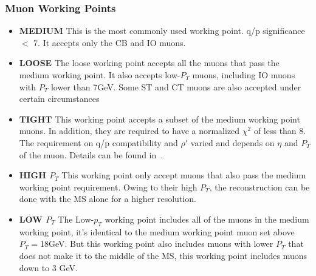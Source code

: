 \subsubsection*{Muon Working Points}
\begin{itemize}

\item \textbf{MEDIUM} \newline
This is the most commonly used working point. q/p significance $<$ 7. It accepts only the CB and IO muons.  

\item \textbf{LOOSE} \newline
    The loose working point accepts all the muons that pass the medium working point. It also accepts low-$P_{T}$ muons, including IO muons with $P_{T}$ lower than 7GeV. Some ST and CT muons are also accepted under certain circumstances~\cite{muonReco2016}

\item \textbf{TIGHT} \newline
    This working point accepts a subset of the medium working point muons. In addition, they are required to have a normalized $\chi^{2}$ of less than 8. The requirement on q/p compatibility and $\rho'$ varied and depends on $\eta$ and $P_{T}$ of the muon. Details can be found in~\cite{muonReco2016}.

\item \textbf{HIGH $P_{T}$} \newline
This working point only accept muons that also pass the medium working point requirement. Owing to their high $P_{T}$, the reconstruction can be done with the MS alone for a higher resolution.

\item \textbf{LOW $P_{T}$} \newline
The Low-$p_{T}$ working point includes all of the muons in the medium working point, it's identical to the medium working point muon set above $P_{T}=$18GeV. But this working point also includes muons with lower $P_{T}$ that does not make it to the middle of the MS, this working point includes muons down to 3 GeV. 

\end{itemize}

